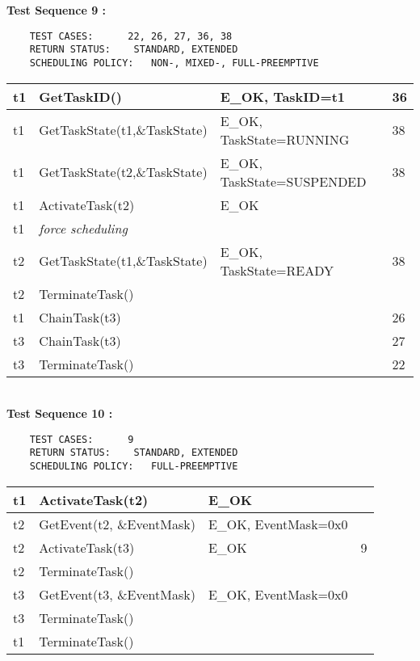 \documentclass[10pt]{article}
\newlength{\Li}\settowidth{\Li}{Running}
\newlength{\Lii}\setlength{\Lii}{7cm}
\newlength{\Liiii}\setlength{\Liiii}{0.9cm}
\newlength{\Liii}\setlength{\Liii}{\textwidth} \addtolength{\Liii}{-\Li} \addtolength{\Liii}{-\Lii} \addtolength{\Liii}{-\Liiii}
\begin{document}
	\textbf{Test Sequence 9 :}
	\begin{lstlisting}
	TEST CASES:		 22, 26, 27, 36, 38
	RETURN STATUS:	  STANDARD, EXTENDED
	SCHEDULING POLICY:   NON-, MIXED-, FULL-PREEMPTIVE
	\end{lstlisting}
	

	\begin{supertabular}{|p{\Li}|p{\Lii}|p{\Liii}|p{\Liiii}|} \hline 	
	t1 	& GetTaskID()						& E\_OK, TaskID=t1			& 36 \\ \hline 
	t1	& GetTaskState(t1,\&TaskState)		& E\_OK, TaskState=RUNNING	& 38 \\ \hline
	t1	& GetTaskState(t2,\&TaskState)		& E\_OK, TaskState=SUSPENDED	& 38 \\ \hline
	t1	& ActivateTask(t2)					& E\_OK						& \\ \hline
	t1 	& \textit{force scheduling}				& 							& \\ \hline
	t2	& GetTaskState(t1,\&TaskState)		& E\_OK, TaskState=READY		& 38 \\ \hline
	t2	& TerminateTask() 					&							& \\ \hline
	t1 	& ChainTask(t3) 				& 							& 26 \\ \hline
	t3 	& ChainTask(t3) 			& 							& 27 \\ \hline
	t3	& TerminateTask() 				&							& 22 \\ \hline
	\end{supertabular} \\

	\textbf{Test Sequence 10 :}
	\begin{lstlisting}
	TEST CASES:		 9
	RETURN STATUS:	  STANDARD, EXTENDED
	SCHEDULING POLICY:   FULL-PREEMPTIVE
	\end{lstlisting}
	

	\begin{supertabular}{|p{\Li}|p{\Lii}|p{\Liii}|p{\Liiii}|} \hline
	t1 	& ActivateTask(t2) 			& E\_OK				& \\ \hline 
	t2 	& GetEvent(t2, \&EventMask) 	& E\_OK, EventMask=0x0	& \\ \hline  
	t2	& ActivateTask(t3)			& E\_OK				& 9  \\ \hline 
	t2	& TerminateTask()				&					&  \\ \hline 
	t3	& GetEvent(t3, \&EventMask) 	& E\_OK, EventMask=0x0	& \\ \hline 
	t3	& TerminateTask()				&					&  \\ \hline 
	t1	& TerminateTask() 				&					& \\ \hline 
	\end{supertabular} \\
	
\end{document}
